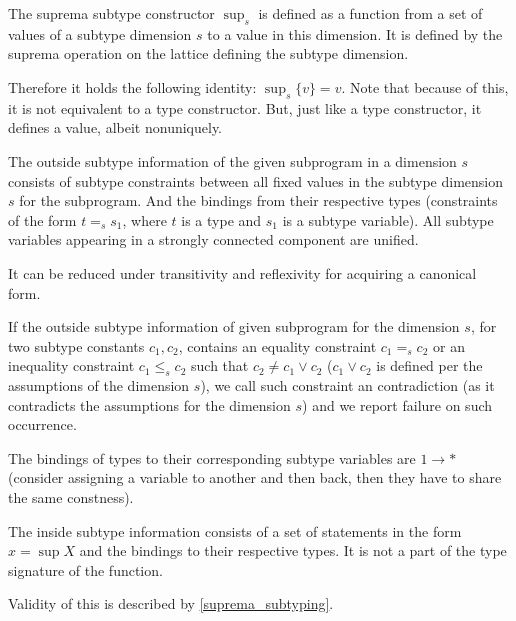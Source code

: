 \begin{defn}
    The suprema subtype constructor $\sup_s$ is defined as a function from a set of values of a subtype dimension $s$ to a value in this dimension. It is defined by the suprema operation on the lattice defining the subtype dimension.

    Therefore it holds the following identity: $\sup_s \{v\} = v$. Note that because of this, it is not equivalent to a type constructor. But, just like a type constructor, it defines a value, albeit nonuniquely.
\end{defn}

\begin{defn}
    The outside subtype information of the given subprogram in a dimension $s$ consists of subtype constraints between all fixed values in the subtype dimension $s$ for the subprogram. And the bindings from their respective types (constraints of the form $t =_s s_1$, where $t$ is a type and $s_1$ is a subtype variable). All subtype variables appearing in a strongly connected component are unified.

    It can be reduced under transitivity and reflexivity for acquiring a canonical form.
\end{defn}

\begin{defn}
    \label{def:contra}
    If the outside subtype information of given subprogram for the dimension $s$, for two subtype constants $c_1, c_2$, contains an equality constraint $c_1 =_s c_2$ or an inequality constraint $c_1 \leq_s c_2$ such that $c_2 \neq c_1 \lor c_2$ ($c_1 \lor c_2$ is defined per the assumptions of the dimension $s$), we call such constraint an contradiction (as it contradicts the assumptions for the dimension $s$) and we report failure on such occurrence.
\end{defn}

\begin{remark}
    The bindings of types to their corresponding subtype variables are $1 \to \ast$ (consider assigning a variable to another and then back, then they have to share the same constness).
\end{remark}

\begin{defn}
    The inside subtype information consists of a set of statements in the form $x = \sup X$ and the bindings to their respective types. It is not a part of the type signature of the function.

    Validity of this is described by \cref{suprema_subtyping}.
\end{defn}

